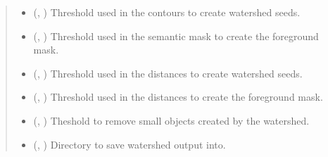 \documentclass[letterpaper,10pt,english]{sphinxmanual}
\begin{document}
\begin{fulllineitems}
\begin{quote}
\begin{description}
\begin{itemize}
\item {} 
 (, ) \textendash{} Threshold used in the contours to create watershed seeds.

\item {} 
 (, ) \textendash{} Threshold used in the semantic mask to create the foreground mask.

\item {} 
 (, ) \textendash{} Threshold used in the distances to create watershed seeds.

\item {} 
 (, ) \textendash{} Threshold used in the distances to create the foreground mask.

\item {} 
 (, ) \textendash{} Theshold to remove small objects created by the watershed.

\item {} 
 (, ) \textendash{} Directory to save watershed output into.

\end{itemize}

\end{description}\end{quote}

\end{fulllineitems}

\end{document}
